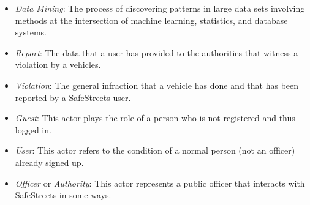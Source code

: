 \begin{itemize}
	\item \textit{Data Mining}: The process of discovering patterns in large data sets involving methods at the intersection of machine learning, statistics, and database systems.
	\item \textit{Report}: The data that a user has provided to the authorities that witness a violation by a vehicles.
	\item \textit{Violation}: The general infraction that a vehicle has done and that has been reported by a SafeStreets user.\\
	\item \textit{Guest}: This actor plays the role of a person who is not registered and thus logged in.
	\item \textit{User}: This actor refers to the condition of a normal person (not an officer) already signed up.
	\item \textit{Officer} or \textit{Authority}: This actor represents a public officer that interacts with SafeStreets in some ways.
\end{itemize}